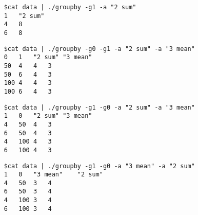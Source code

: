 	\begin{verbatim}
	$cat data | ./groupby -g1 -a "2 sum"
	1	"2 sum"
	4	8
	6	8
	\end{verbatim}

	\begin{verbatim}
	$cat data | ./groupby -g0 -g1 -a "2 sum" -a "3 mean"
	0	1	"2 sum"	"3 mean"
	50	4	4	3
	50	6	4	3
	100	4	4	3
	100	6	4	3
	\end{verbatim}

	\begin{verbatim}
	$cat data | ./groupby -g1 -g0 -a "2 sum" -a "3 mean"
	1	0	"2 sum"	"3 mean"
	4	50	4	3
	6	50	4	3
	4	100	4	3
	6	100	4	3
	\end{verbatim}

	\begin{verbatim}
	$cat data | ./groupby -g1 -g0 -a "3 mean" -a "2 sum"
	1	0	"3 mean"	"2 sum"
	4	50	3	4
	6	50	3	4
	4	100	3	4
	6	100	3	4
	\end{verbatim}
